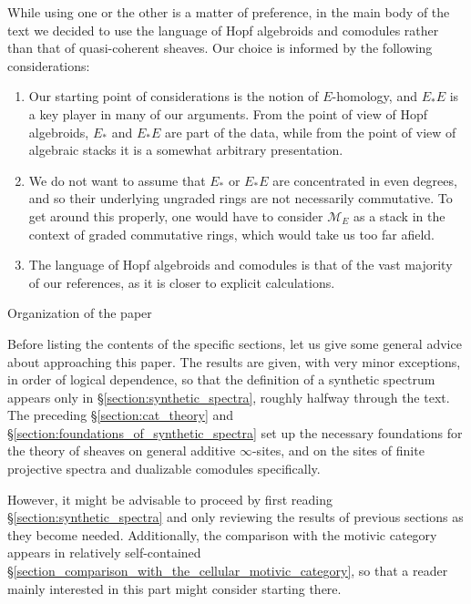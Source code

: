 \documentclass[oneside,a4paper]{amsart}
\makeatletter
\theoremstyle{plain}
\theoremstyle{definition}
\theoremstyle{remark}
\def\subsection{\@startsection{subsection}{1}%
  \z@{.7\linespacing\@plus\linespacing}{.5\linespacing}%
  {\normalfont\bfseries\centering}}%
\makeatother
\begin{document}
While using one or the other is a matter of preference, in the main body of the text we decided to use the language of Hopf algebroids and comodules rather than that of quasi-coherent sheaves. Our choice is informed by the following considerations: 
\begin{enumerate}
    \item Our starting point of considerations is the notion of $E$-homology, and $E_{*}E$ is a key player in many of our arguments. From the point of view of Hopf algebroids, $E_{*}$ and $E_{*}E$ are part of the data, while from the point of view of algebraic stacks it is a somewhat arbitrary presentation.
    \item We do not want to assume that $E_{*}$ or $E_{*}E$ are concentrated in even degrees, and so their underlying ungraded rings are not necessarily commutative. To get around this properly, one would have to consider $\mathcal{M}_{E}$ as a stack in the context of graded commutative rings, which would take us too far afield.
    \item The language of Hopf algebroids and comodules is that of the vast majority of our references, as it is closer to explicit calculations.
\end{enumerate}

\subsection{Organization of the paper} 

Before listing the contents of the specific sections, let us give some general advice about approaching this paper. The results are given, with very minor exceptions, in order of logical dependence, so that the definition of a synthetic spectrum appears only in \S\ref{section:synthetic_spectra}, roughly halfway through the text. The preceding \S\ref{section:cat_theory} and \S\ref{section:foundations_of_synthetic_spectra} set up the necessary foundations for the theory of sheaves on general additive $\infty$-sites, and on the sites of finite projective spectra and dualizable comodules specifically. 

However, it might be advisable to proceed by first reading \S\ref{section:synthetic_spectra} and only reviewing the results of previous sections as they become needed. Additionally, the comparison with the motivic category appears in relatively self-contained \S\ref{section_comparison_with_the_cellular_motivic_category}, so that a reader mainly interested in this part might consider starting there. 
\end{document}
